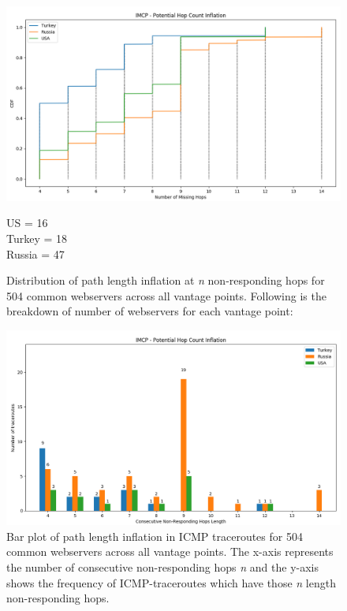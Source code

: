 \begin{figure}[!h]
\centering
  \includegraphics[width=\linewidth]{figures/missing-hops-cdf.png}
  \caption{Distribution of path length inflation at \textit{n} non-responding hops for 504 common webservers across all vantage points. Following is the breakdown of number of webservers for each vantage point:}
  \label{fig:inflated-path-cdf}
  
  US = 16\\
  Turkey = 18\\
  Russia = 47\\
  
\end{figure}

\begin{figure}[!h]
\centering
  \includegraphics[width=\linewidth]{figures/missing-hops-bar.png}
  \caption{Bar plot of path length inflation in ICMP traceroutes for 504 common webservers across all vantage points. The x-axis represents the number of consecutive non-responding hops \textit{n} and the y-axis shows the frequency of ICMP-traceroutes which have those \textit{n} length non-responding hops.}
  \label{fig:inflated-path-bar}
\end{figure}

